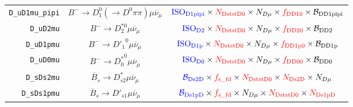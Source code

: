\begin{landscape}
\begin{table}
\begin{tabular}{r|c|c}
  \texttt{D\_uD1mu\_pipi} &       $B^- \rightarrow D_1^0 (\rightarrow D^0 \pi\pi) \mu \overline{\nu}_\mu$        &                                                                                           $\textcolor{blue}{\text{ISO}_\text{D1pipi}} \times \textcolor{red}{N_\text{DststD0}} \times N_{D \mu} \times \textcolor{red}{f_\text{DD10}} \times \mathcal{B}_\text{DD1pipi}$                                                                                            \\
        \texttt{D\_uD2mu} &                  $B^- \rightarrow D_2^{*0} \mu \overline{\nu}_\mu$                   &                                                                                               $\textcolor{blue}{\text{ISO}_\text{D2}} \times \textcolor{red}{N_\text{DststD0}} \times N_{D \mu} \times \textcolor{red}{f_\text{DD20}} \times \mathcal{B}_\text{DD2}$                                                                                                \\
       \texttt{D\_uD1pmu} &                  $B^- \rightarrow {D'_1}^0 \mu \overline{\nu}_\mu$                   &                                                                                              $\textcolor{blue}{\text{ISO}_\text{D1p}} \times \textcolor{red}{N_\text{DststD0}} \times N_{D \mu} \times \textcolor{red}{f_\text{DD1p0}} \times \mathcal{B}_\text{DD1p}$                                                                                              \\
        \texttt{D\_uD0mu} &                  $B^- \rightarrow {D^*_0}^0 \mu \overline{\nu}_\mu$                  &                                                                                               $\textcolor{blue}{\text{ISO}_\text{D0}} \times \textcolor{red}{N_\text{DststD0}} \times N_{D \mu} \times \textcolor{red}{f_\text{DD00}} \times \mathcal{B}_\text{DD0}$                                                                                                \\
       \texttt{D\_sDs2mu} &             $\overline{B}_s \rightarrow D_{s2}^* \mu \overline{\nu}_\mu$             &                                                                                         $\textcolor{blue}{\mathcal{B}_\text{Ds2D}} \times \textcolor{red}{f_\text{s\_fd}} \times \textcolor{red}{N_\text{DststD0}} \times \textcolor{red}{N_\text{Ds2D}} \times N_{D \mu}$                                                                                          \\
      \texttt{D\_sDs1pmu} &             $\overline{B}_s \rightarrow D'_{s1} \mu \overline{\nu}_\mu$              &                                                                                        $\textcolor{blue}{\mathcal{B}_\text{Ds1pD}} \times \textcolor{red}{f_\text{s\_fd}} \times N_{D \mu} \times \textcolor{red}{N_\text{DststD0}} \times \textcolor{red}{N_\text{Ds1pD}}$                                                                                         \\

\end{tabular}
\end{table}
\end{landscape}

